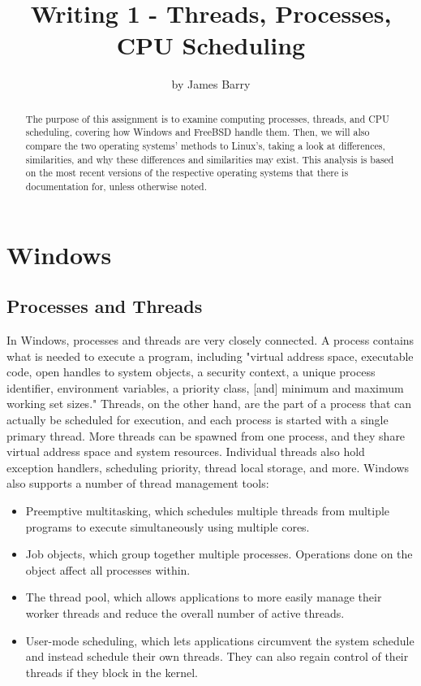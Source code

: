 \documentclass[draftclsnofoot,onecolumn,journal,letterpaper,10pt]{IEEEtran}
\title{Writing 1 - Threads, Processes, CPU Scheduling}
\author{by James Barry}
\begin{document}
\begin{titlepage}
  \clearpage
  \maketitle
  \thispagestyle{empty}
    \begin{abstract}
      The purpose of this assignment is to examine computing processes, threads, and CPU scheduling, covering how Windows and FreeBSD handle them. Then, we will also compare the two operating systems' methods to Linux's, taking a look at differences, similarities, and why these differences and similarities may exist. This analysis is based on the most recent versions of the respective operating systems that there is documentation for, unless otherwise noted.
    \end{abstract}
\end{titlepage}

\tableofcontents
\pagebreak

\section{Windows}

\subsection{Processes and Threads}
In Windows, processes and threads are very closely connected. A process contains what is needed to execute a program, including "virtual address space, executable code, open handles to system objects, a security context, a unique process identifier, environment variables, a priority class, [and] minimum and maximum working set sizes." \cite{windowsprocesses:online} Threads, on the other hand, are the part of a process that can actually be scheduled for execution, and each process is started with a single primary thread. More threads can be spawned from one process, and they share virtual address space and system resources. Individual threads also hold exception handlers, scheduling priority, thread local storage, and more. Windows also supports a number of thread management tools:

\begin{itemize}
\item Preemptive multitasking, which schedules multiple threads from multiple programs to execute simultaneously using multiple cores.
\item Job objects, which group together multiple processes. Operations done on the object affect all processes within.
\item The thread pool, which allows applications to more easily manage their worker threads and reduce the overall number of active threads. 
\item User-mode scheduling, which lets applications circumvent the system schedule and instead schedule their own threads. They can also regain control of their threads if they block in the kernel. 
\end{itemize}
\end{document}

